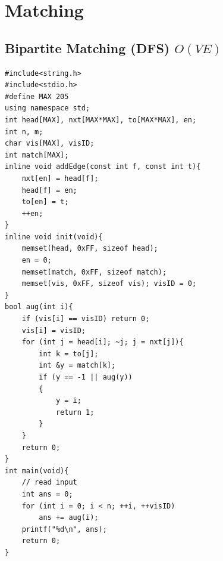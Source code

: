 \documentclass[12pt]{book}
\begin{document}
\chapter{Matching}
\section{Bipartite Matching (DFS) $O(VE)$}
\begin{verbatim}
#include<string.h>
#include<stdio.h>
#define MAX 205
using namespace std;
int head[MAX], nxt[MAX*MAX], to[MAX*MAX], en;
int n, m;
char vis[MAX], visID;
int match[MAX];
inline void addEdge(const int f, const int t){
	nxt[en] = head[f];
	head[f] = en;
	to[en] = t;
	++en;
}
inline void init(void){
	memset(head, 0xFF, sizeof head);
	en = 0;
	memset(match, 0xFF, sizeof match);
	memset(vis, 0xFF, sizeof vis); visID = 0;
}
bool aug(int i){
	if (vis[i] == visID) return 0;
	vis[i] = visID;
	for (int j = head[i]; ~j; j = nxt[j]){
		int k = to[j];
		int &y = match[k];
		if (y == -1 || aug(y))
		{
			y = i;
			return 1;
		}
	}
	return 0;
}
int main(void){
	// read input
	int ans = 0;
	for (int i = 0; i < n; ++i, ++visID)
		ans += aug(i);
	printf("%d\n", ans);
	return 0;
}
\end{verbatim}
\end{document}
